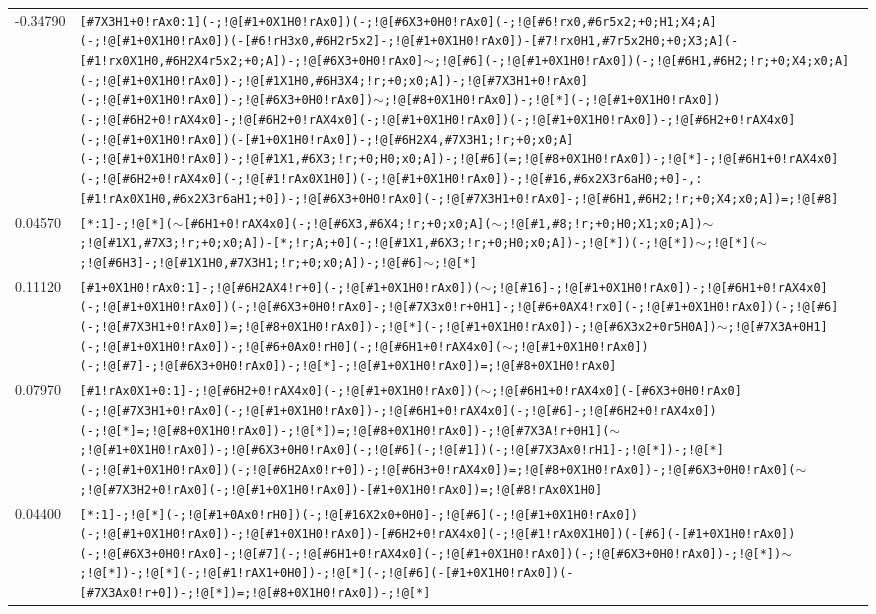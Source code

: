 \begin{longtable}{>{\baselineskip=10pt}p{} >{\baselineskip=10pt}p{}}
-0.34790 & \texttt{[\#7X3H1+0!rAx0:1](-;!@[\#1+0X1H0!rAx0])(-;!@[\#6X3+0H0!rAx0](-;!@[\#6!rx0,\#6r5x2;+0;H1;X4;A](-;!@[\#1+0X1H0!rAx0])(-[\#6!rH3x0,\#6H2r5x2]-;!@[\#1+0X1H0!rAx0])-[\#7!rx0H1,\#7r5x2H0;+0;X3;A](-[\#1!rx0X1H0,\#6H2X4r5x2;+0;A])-;!@[\#6X3+0H0!rAx0]$\sim$;!@[\#6](-;!@[\#1+0X1H0!rAx0])(-;!@[\#6H1,\#6H2;!r;+0;X4;x0;A](-;!@[\#1+0X1H0!rAx0])-;!@[\#1X1H0,\#6H3X4;!r;+0;x0;A])-;!@[\#7X3H1+0!rAx0](-;!@[\#1+0X1H0!rAx0])-;!@[\#6X3+0H0!rAx0])$\sim$;!@[\#8+0X1H0!rAx0])-;!@[*](-;!@[\#1+0X1H0!rAx0])(-;!@[\#6H2+0!rAX4x0]-;!@[\#6H2+0!rAX4x0](-;!@[\#1+0X1H0!rAx0])(-;!@[\#1+0X1H0!rAx0])-;!@[\#6H2+0!rAX4x0](-;!@[\#1+0X1H0!rAx0])(-[\#1+0X1H0!rAx0])-;!@[\#6H2X4,\#7X3H1;!r;+0;x0;A](-;!@[\#1+0X1H0!rAx0])-;!@[\#1X1,\#6X3;!r;+0;H0;x0;A])-;!@[\#6](=;!@[\#8+0X1H0!rAx0])-;!@[*]-;!@[\#6H1+0!rAX4x0](-;!@[\#6H2+0!rAX4x0](-;!@[\#1!rAx0X1H0])(-;!@[\#1+0X1H0!rAx0])-;!@[\#16,\#6x2X3r6aH0;+0]-,:[\#1!rAx0X1H0,\#6x2X3r6aH1;+0])-;!@[\#6X3+0H0!rAx0](-;!@[\#7X3H1+0!rAx0]-;!@[\#6H1,\#6H2;!r;+0;X4;x0;A])=;!@[\#8]} \\ 
0.04570 & \texttt{[*:1]-;!@[*]($\sim$[\#6H1+0!rAX4x0](-;!@[\#6X3,\#6X4;!r;+0;x0;A]($\sim$;!@[\#1,\#8;!r;+0;H0;X1;x0;A])$\sim$;!@[\#1X1,\#7X3;!r;+0;x0;A])-[*;!r;A;+0](-;!@[\#1X1,\#6X3;!r;+0;H0;x0;A])-;!@[*])(-;!@[*])$\sim$;!@[*]($\sim$;!@[\#6H3]-;!@[\#1X1H0,\#7X3H1;!r;+0;x0;A])-;!@[\#6]$\sim$;!@[*]} \\ 
0.11120 & \texttt{[\#1+0X1H0!rAx0:1]-;!@[\#6H2AX4!r+0](-;!@[\#1+0X1H0!rAx0])($\sim$;!@[\#16]-;!@[\#1+0X1H0!rAx0])-;!@[\#6H1+0!rAX4x0](-;!@[\#1+0X1H0!rAx0])(-;!@[\#6X3+0H0!rAx0]-;!@[\#7X3x0!r+0H1]-;!@[\#6+0AX4!rx0](-;!@[\#1+0X1H0!rAx0])(-;!@[\#6](-;!@[\#7X3H1+0!rAx0])=;!@[\#8+0X1H0!rAx0])-;!@[*](-;!@[\#1+0X1H0!rAx0])-;!@[\#6X3x2+0r5H0A])$\sim$;!@[\#7X3A+0H1](-;!@[\#1+0X1H0!rAx0])-;!@[\#6+0Ax0!rH0](-;!@[\#6H1+0!rAX4x0]($\sim$;!@[\#1+0X1H0!rAx0])(-;!@[\#7]-;!@[\#6X3+0H0!rAx0])-;!@[*]-;!@[\#1+0X1H0!rAx0])=;!@[\#8+0X1H0!rAx0]} \\ 
0.07970 & \texttt{[\#1!rAx0X1+0:1]-;!@[\#6H2+0!rAX4x0](-;!@[\#1+0X1H0!rAx0])($\sim$;!@[\#6H1+0!rAX4x0](-[\#6X3+0H0!rAx0](-;!@[\#7X3H1+0!rAx0](-;!@[\#1+0X1H0!rAx0])-;!@[\#6H1+0!rAX4x0](-;!@[\#6]-;!@[\#6H2+0!rAX4x0])(-;!@[*]=;!@[\#8+0X1H0!rAx0])-;!@[*])=;!@[\#8+0X1H0!rAx0])-;!@[\#7X3A!r+0H1]($\sim$;!@[\#1+0X1H0!rAx0])-;!@[\#6X3+0H0!rAx0](-;!@[\#6](-;!@[\#1])(-;!@[\#7X3Ax0!rH1]-;!@[*])-;!@[*](-;!@[\#1+0X1H0!rAx0])(-;!@[\#6H2Ax0!r+0])-;!@[\#6H3+0!rAX4x0])=;!@[\#8+0X1H0!rAx0])-;!@[\#6X3+0H0!rAx0]($\sim$;!@[\#7X3H2+0!rAx0](-;!@[\#1+0X1H0!rAx0])-[\#1+0X1H0!rAx0])=;!@[\#8!rAx0X1H0]} \\ 
0.04400 & \texttt{[*:1]-;!@[*](-;!@[\#1+0Ax0!rH0])(-;!@[\#16X2x0+0H0]-;!@[\#6](-;!@[\#1+0X1H0!rAx0])(-;!@[\#1+0X1H0!rAx0])-;!@[\#1+0X1H0!rAx0])-[\#6H2+0!rAX4x0](-;!@[\#1!rAx0X1H0])(-[\#6](-[\#1+0X1H0!rAx0])(-;!@[\#6X3+0H0!rAx0]-;!@[\#7](-;!@[\#6H1+0!rAX4x0](-;!@[\#1+0X1H0!rAx0])(-;!@[\#6X3+0H0!rAx0])-;!@[*])$\sim$;!@[*])-;!@[*](-;!@[\#1!rAX1+0H0])-;!@[*](-;!@[\#6](-[\#1+0X1H0!rAx0])(-[\#7X3Ax0!r+0])-;!@[*])=;!@[\#8+0X1H0!rAx0])-;!@[*]} \\ 

\end{longtable}
